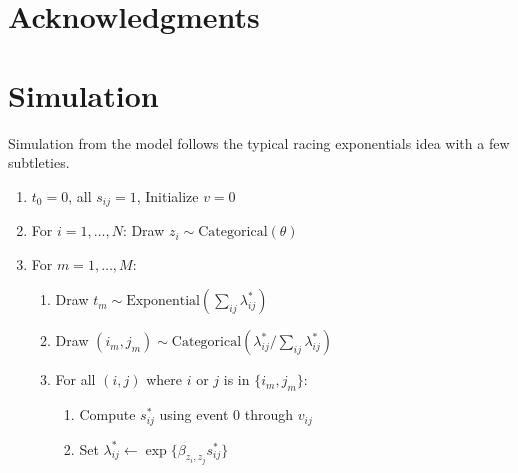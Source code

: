 \documentclass{article}
\begin{document}
\section*{Acknowledgments} 
 


\appendix
\section{Simulation}

Simulation from the model follows the typical racing exponentials idea with a few subtleties.

\begin{enumerate}
\item $t_0 = 0$, all $s_{ij} = 1$, Initialize $v = 0$
\item For $i = 1, \ldots, N$: Draw $z_i \sim \mbox{Categorical}(\theta)$
\item For $m = 1, \ldots, M$:
  \begin{enumerate}
  \item Draw $t_m \sim \mbox{Exponential}\left(\sum_{ij} \lambda_{ij}^*\right)$
  \item Draw $(i_m,j_m) \sim \mbox{Categorical}\left(\lambda_{ij}^* / \sum_{ij}\lambda_{ij}^*\right)$
  \item For all $(i,j)$ where $i$ or $j$ is in $\{i_m,j_m\}$:
    \begin{enumerate}
    \item Compute $s_{ij}^*$ using event $0$ through $v_{ij}$
    \item Set $\lambda_{ij}^* \leftarrow \exp\{ \beta_{z_i,z_j} s_{ij}^*\}$ 
    \end{enumerate}
  \end{enumerate}
\end{enumerate}




\end{document}
